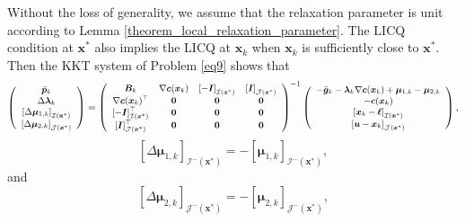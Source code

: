 \documentclass[aos]{imsart}
\numberwithin{equation}{section}
\theoremstyle{plain}
\begin{document}
   Without the loss of generality, we assume that the relaxation parameter is unit according to Lemma \ref{theorem_local_relaxation_parameter}. The LICQ condition at $\bm{x}^{*}$ also implies the LICQ at $\bm{x}_k$ when $\bm{x}_k$ is sufficiently close to $\bm{x}^{*}$. Then the KKT system of Problem \eqref{eq9} shows that
   \begin{equation}
   \footnotesize
\label{eq29}
    \left( \begin{array}{c}
        \Bar{\bm{p}}_k \\
        \Delta \bm{\lambda}_{k}\\
        \left[\Delta \bm{\mu}_{1,k} \right]_{\mathcal{I}(\bm{x}^{*})} \\
        \left[\Delta \bm{\mu}_{2,k} \right]_{\mathcal{J}(\bm{x}^{*})}
    \end{array} \right) =  \left( \begin{array}{cccc}
           \bm{B}_k & \nabla \bm{c}(\bm{x}_k) & \left[-\bm{I}\right]_{\mathcal{I}(\bm{x}^{*})} & \left[\bm{I}\right]_{\mathcal{J}(\bm{x}^{*})}\\
           \nabla \bm{c}(\bm{x}_k)^{\top} & \bm{0} & \bm{0} & \bm{0}\\
           \left[-\bm{I}\right]_{\mathcal{I}(\bm{x}^{*})}^{\top} & \bm{0} & \bm{0} & \bm{0} \\
           \left[\bm{I}\right]_{\mathcal{J}(\bm{x}^{*})}^{\top} & \bm{0} & \bm{0} & \bm{0}
       \end{array} \right)^{-1} \left( \begin{array}{c}
        - \Bar{\bm{g}}_k - \bm{\lambda}_{k} \nabla \bm{c}(\bm{x}_k)  + \bm{\mu}_{1,k} - \bm{\mu}_{2,k}\\
        -\bm{c}(\bm{x}_k)\\
        \left[\bm{x}_k - \bm{\ell}\right]_{\mathcal{I}(\bm{x}^{*})}\\
        \left[\bm{u} - \bm{x}_{k}\right]_{\mathcal{J}(\bm{x}^{*})}
       \end{array} \right),
\end{equation}
\begin{equation*}
    \left[\Delta \bm{\mu}_{1,k} \right]_{\mathcal{I}^{-}(\bm{x}^{*})} = - \left[ \bm{\mu}_{1,k} \right]_{\mathcal{I}^{-}(\bm{x}^{*})},
\end{equation*}
and
\begin{equation*}
    \left[\Delta \bm{\mu}_{2,k} \right]_{\mathcal{J}^{-}(\bm{x}^{*})} = - \left[ \bm{\mu}_{2,k} \right]_{\mathcal{J}^{-}(\bm{x}^{*})},
\end{equation*}
\end{document}
